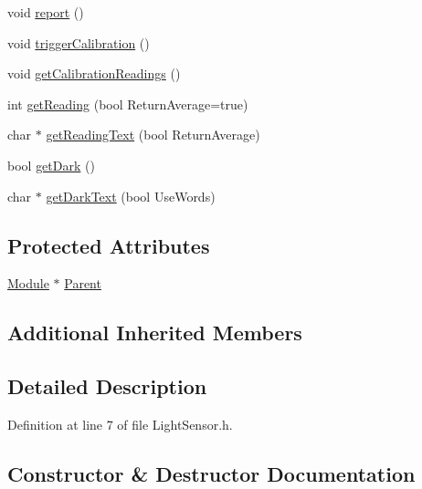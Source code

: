 \begin{DoxyCompactItemize}
\item 
void \hyperlink{class_light_sensor_a08ffec2f2bbb09966a8e37bf1f9887f9}{report} ()
\item 
void \hyperlink{class_light_sensor_a50559883ebb2c80a5d2144a6453bd1c3}{trigger\+Calibration} ()
\item 
void \hyperlink{class_light_sensor_a73dea4504d64c13c43a5c68bee9aef27}{get\+Calibration\+Readings} ()
\item 
int \hyperlink{class_light_sensor_a90177d0d28db7e651f63da45bafcc61b}{get\+Reading} (bool Return\+Average=true)
\item 
char $\ast$ \hyperlink{class_light_sensor_a4430f299e7c8aafa47bc47ab291c78a3}{get\+Reading\+Text} (bool Return\+Average)
\item 
bool \hyperlink{class_light_sensor_a06881cb787b1968daf4d1a49923617fe}{get\+Dark} ()
\item 
char $\ast$ \hyperlink{class_light_sensor_a701ea113624ff3188aa728930c7869de}{get\+Dark\+Text} (bool Use\+Words)
\end{DoxyCompactItemize}
\subsection*{Protected Attributes}
\begin{DoxyCompactItemize}
\item 
\hyperlink{class_module}{Module} $\ast$ \hyperlink{class_light_sensor_afc358d440691edea541b12acf84e53c9}{Parent}
\end{DoxyCompactItemize}
\subsection*{Additional Inherited Members}


\subsection{Detailed Description}


Definition at line 7 of file Light\+Sensor.\+h.



\subsection{Constructor \& Destructor Documentation}
\mbox{\label{class_light_sensor_aa2b15bb718f72a125dcc068300abfba7}} 

